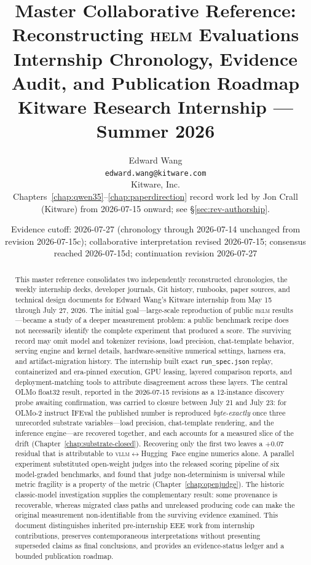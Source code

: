 \documentclass[11pt]{report}
\title{\bfseries Master Collaborative Reference: Reconstructing \textsc{helm} Evaluations\\[4pt]
  \large Internship Chronology, Evidence Audit, and Publication Roadmap\\[10pt]
  \normalsize Kitware Research Internship --- Summer 2026}
\author{Edward Wang\\ \texttt{edward.wang@kitware.com}\\[4pt]
  \small Kitware, Inc.\\[6pt]
  \small\normalfont Chapters~\ref{chap:qwen35}--\ref{chap:paperdirection} record
  work led by Jon Crall (Kitware) from 2026-07-15 onward; see
  \S\ref{sec:rev-authorship}.}
\date{Evidence cutoff: 2026-07-27 (chronology through 2026-07-14 unchanged from
  revision 2026-07-15c); collaborative interpretation revised 2026-07-15;
  consensus reached 2026-07-15d; continuation revision 2026-07-27}
\newcommand{\file}[1]{\texttt{#1}}
\begin{document}
\maketitle

\begin{abstract}
\noindent
This master reference consolidates two independently reconstructed chronologies,
the weekly internship decks, developer journals, Git history, runbooks, paper
sources, and technical design documents for Edward Wang's Kitware internship from
May 15 through July 27, 2026. The initial goal---large-scale reproduction of public
\textsc{helm} results---became a study of a deeper measurement problem: a public
benchmark recipe does not necessarily identify the complete experiment that
produced a score. The surviving record may omit model and tokenizer revisions,
load precision, chat-template behavior, serving engine and kernel details,
hardware-sensitive numerical settings, harness era, and artifact-migration history.
The internship built exact \file{run\_spec.json} replay, containerized and era-pinned
execution, GPU leasing, layered comparison reports, and deployment-matching tools to
attribute disagreement across these layers. The central OLMo float32 result, reported
in the 2026-07-15 revisions as a 12-instance discovery probe awaiting confirmation,
was carried to closure between July 21 and July 23: for OLMo-2 instruct IFEval the
published number is reproduced \emph{byte-exactly} once three unrecorded substrate
variables---load precision, chat-template rendering, and the inference engine---are
recovered together, and each accounts for a measured slice of the drift
(Chapter~\ref{chap:substrate-closed}). Recovering only the first two leaves a
$+0.07$ residual that is attributable to \textsc{vllm}$\leftrightarrow$Hugging~Face
engine numerics alone. A parallel experiment substituted open-weight judges into
the released scoring pipeline of six model-graded benchmarks, and found that judge
non-determinism is universal while metric fragility is a property of the metric
(Chapter~\ref{chap:openjudge}). The historic
classic-model investigation supplies the complementary result: some provenance is
recoverable, whereas migrated class paths and unreleased producing code can make the
original measurement non-identifiable from the surviving evidence examined. This document distinguishes inherited
pre-internship EEE work from internship contributions, preserves contemporaneous
interpretations without presenting superseded claims as final conclusions, and
provides an evidence-status ledger and a bounded publication roadmap.
\end{abstract}
\end{document}
